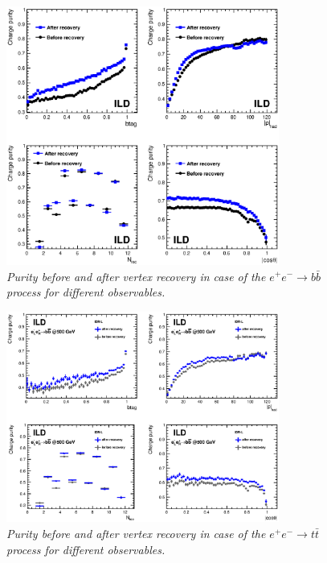 \documentclass[preprint]{elsarticle}
\begin{document}
\begin{figure}
\centering
\includegraphics[width=0.8\textwidth]{figures_Methods/b_purity_VR_ttbar_l5.eps}
\caption{\label{vr_and_bquarkpurity_bbbar} \sl Purity before and after vertex recovery in case of the  $e^+e^-\rightarrow b\bar{b}$ process for different observables.}
\end{figure}

\begin{figure}
\centering
\includegraphics[width=0.8\textwidth]{figures_Methods/b_purity_VR_bbbar_l5.eps}
\caption{\label{vr_and_bquarkpurity_ttbar} \sl Purity before and after vertex recovery in case of the  $e^+e^-\rightarrow t\bar{t}$ process for different observables.}
\end{figure}
\end{document}
